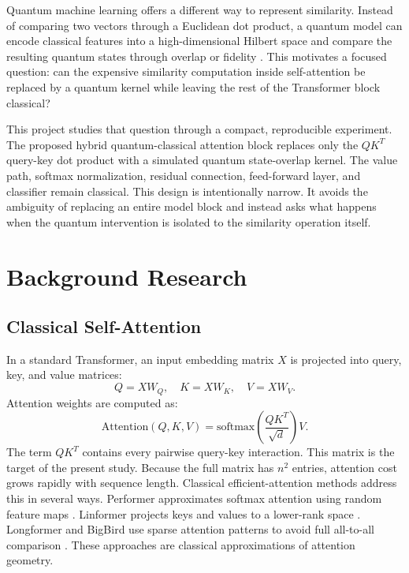 \documentclass[11pt]{article}
\begin{document}
Quantum machine learning offers a different way to represent similarity. Instead of comparing two vectors through a Euclidean dot product, a quantum model can encode classical features into a high-dimensional Hilbert space and compare the resulting quantum states through overlap or fidelity \cite{schuld2019quantum,havlicek2019supervised}. This motivates a focused question: can the expensive similarity computation inside self-attention be replaced by a quantum kernel while leaving the rest of the Transformer block classical?

This project studies that question through a compact, reproducible experiment. The proposed hybrid quantum-classical attention block replaces only the \(QK^T\) query-key dot product with a simulated quantum state-overlap kernel. The value path, softmax normalization, residual connection, feed-forward layer, and classifier remain classical. This design is intentionally narrow. It avoids the ambiguity of replacing an entire model block and instead asks what happens when the quantum intervention is isolated to the similarity operation itself.

\section{Background Research}
\subsection{Classical Self-Attention}
In a standard Transformer, an input embedding matrix \(X\) is projected into query, key, and value matrices:
\[
Q = XW_Q,\quad K = XW_K,\quad V = XW_V.
\]
Attention weights are computed as:
\[
\text{Attention}(Q,K,V)=\text{softmax}\left(\frac{QK^T}{\sqrt{d}}\right)V.
\]
The term \(QK^T\) contains every pairwise query-key interaction. This matrix is the target of the present study. Because the full matrix has \(n^2\) entries, attention cost grows rapidly with sequence length. Classical efficient-attention methods address this in several ways. Performer approximates softmax attention using random feature maps \cite{choromanski2021rethinking}. Linformer projects keys and values to a lower-rank space \cite{wang2020linformer}. Longformer and BigBird use sparse attention patterns to avoid full all-to-all comparison \cite{beltagy2020longformer,zaheer2020bigbird}. These approaches are classical approximations of attention geometry.
\end{document}
